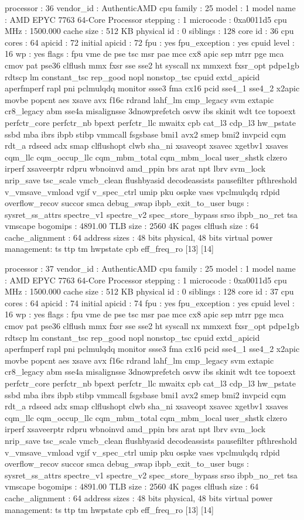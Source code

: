 processor	: 36
vendor_id	: AuthenticAMD
cpu family	: 25
model		: 1
model name	: AMD EPYC 7763 64-Core Processor
stepping	: 1
microcode	: 0xa0011d5
cpu MHz		: 1500.000
cache size	: 512 KB
physical id	: 0
siblings	: 128
core id		: 36
cpu cores	: 64
apicid		: 72
initial apicid	: 72
fpu		: yes
fpu_exception	: yes
cpuid level	: 16
wp		: yes
flags		: fpu vme de pse tsc msr pae mce cx8 apic sep mtrr pge mca cmov pat pse36 clflush mmx fxsr sse sse2 ht syscall nx mmxext fxsr_opt pdpe1gb rdtscp lm constant_tsc rep_good nopl nonstop_tsc cpuid extd_apicid aperfmperf rapl pni pclmulqdq monitor ssse3 fma cx16 pcid sse4_1 sse4_2 x2apic movbe popcnt aes xsave avx f16c rdrand lahf_lm cmp_legacy svm extapic cr8_legacy abm sse4a misalignsse 3dnowprefetch osvw ibs skinit wdt tce topoext perfctr_core perfctr_nb bpext perfctr_llc mwaitx cpb cat_l3 cdp_l3 hw_pstate ssbd mba ibrs ibpb stibp vmmcall fsgsbase bmi1 avx2 smep bmi2 invpcid cqm rdt_a rdseed adx smap clflushopt clwb sha_ni xsaveopt xsavec xgetbv1 xsaves cqm_llc cqm_occup_llc cqm_mbm_total cqm_mbm_local user_shstk clzero irperf xsaveerptr rdpru wbnoinvd amd_ppin brs arat npt lbrv svm_lock nrip_save tsc_scale vmcb_clean flushbyasid decodeassists pausefilter pfthreshold v_vmsave_vmload vgif v_spec_ctrl umip pku ospke vaes vpclmulqdq rdpid overflow_recov succor smca debug_swap ibpb_exit_to_user
bugs		: sysret_ss_attrs spectre_v1 spectre_v2 spec_store_bypass srso ibpb_no_ret tsa vmscape
bogomips	: 4891.00
TLB size	: 2560 4K pages
clflush size	: 64
cache_alignment	: 64
address sizes	: 48 bits physical, 48 bits virtual
power management: ts ttp tm hwpstate cpb eff_freq_ro [13] [14]

processor	: 37
vendor_id	: AuthenticAMD
cpu family	: 25
model		: 1
model name	: AMD EPYC 7763 64-Core Processor
stepping	: 1
microcode	: 0xa0011d5
cpu MHz		: 1500.000
cache size	: 512 KB
physical id	: 0
siblings	: 128
core id		: 37
cpu cores	: 64
apicid		: 74
initial apicid	: 74
fpu		: yes
fpu_exception	: yes
cpuid level	: 16
wp		: yes
flags		: fpu vme de pse tsc msr pae mce cx8 apic sep mtrr pge mca cmov pat pse36 clflush mmx fxsr sse sse2 ht syscall nx mmxext fxsr_opt pdpe1gb rdtscp lm constant_tsc rep_good nopl nonstop_tsc cpuid extd_apicid aperfmperf rapl pni pclmulqdq monitor ssse3 fma cx16 pcid sse4_1 sse4_2 x2apic movbe popcnt aes xsave avx f16c rdrand lahf_lm cmp_legacy svm extapic cr8_legacy abm sse4a misalignsse 3dnowprefetch osvw ibs skinit wdt tce topoext perfctr_core perfctr_nb bpext perfctr_llc mwaitx cpb cat_l3 cdp_l3 hw_pstate ssbd mba ibrs ibpb stibp vmmcall fsgsbase bmi1 avx2 smep bmi2 invpcid cqm rdt_a rdseed adx smap clflushopt clwb sha_ni xsaveopt xsavec xgetbv1 xsaves cqm_llc cqm_occup_llc cqm_mbm_total cqm_mbm_local user_shstk clzero irperf xsaveerptr rdpru wbnoinvd amd_ppin brs arat npt lbrv svm_lock nrip_save tsc_scale vmcb_clean flushbyasid decodeassists pausefilter pfthreshold v_vmsave_vmload vgif v_spec_ctrl umip pku ospke vaes vpclmulqdq rdpid overflow_recov succor smca debug_swap ibpb_exit_to_user
bugs		: sysret_ss_attrs spectre_v1 spectre_v2 spec_store_bypass srso ibpb_no_ret tsa vmscape
bogomips	: 4891.00
TLB size	: 2560 4K pages
clflush size	: 64
cache_alignment	: 64
address sizes	: 48 bits physical, 48 bits virtual
power management: ts ttp tm hwpstate cpb eff_freq_ro [13] [14]

